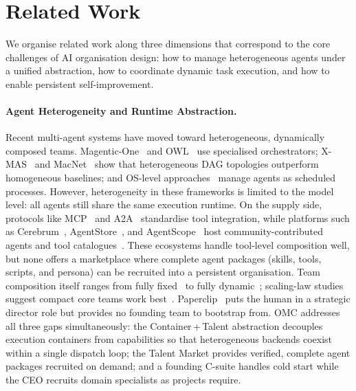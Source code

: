 \documentclass[11pt,a4paper]{article}
\begin{document}
\section{Related Work}
\label{sec:related}

We organise related work along three dimensions that correspond to the core challenges of AI organisation design: how to manage heterogeneous agents under a unified abstraction, how to coordinate dynamic task execution, and how to enable persistent self-improvement.

\paragraph{Agent Heterogeneity and Runtime Abstraction.}
Recent multi-agent systems have moved toward heterogeneous, dynamically composed teams.  Magentic-One~\cite{fourney2024magenticone} and OWL~\cite{hu2025owl} use specialised orchestrators; X-MAS~\cite{ye2025xmas} and MacNet~\cite{qian2025macnet} show that heterogeneous DAG topologies outperform homogeneous baselines; and OS-level approaches~\cite{agentforge2025, mei2025aios} manage agents as scheduled processes.  However, heterogeneity in these frameworks is limited to the model level: all agents still share the same execution runtime.  On the supply side, protocols like MCP~\cite{hou2025mcp} and A2A~\cite{google2025a2a} standardise tool integration, while platforms such as Cerebrum~\cite{rama2025cerebrum, mei2025aios}, AgentStore~\cite{jia2025agentstore}, and AgentScope~\cite{gao2025agentscope} host community-contributed agents and tool catalogues~\cite{yang2025sweagent, mcpzoo2025, singh2025registry, ehtesham2025interop}.  These ecosystems handle tool-level composition well, but none offers a marketplace where complete agent packages (skills, tools, scripts, and persona) can be recruited into a persistent organisation.  Team composition itself ranges from fully fixed~\cite{fourney2024magenticone, hu2025owl, teamofrivals2025} to fully dynamic~\cite{liu2025dylan, zhang2025aflow, shang2025agentsquare, hu2025evomac}; scaling-law studies suggest compact core teams work best~\cite{qian2025macnet, tran2025masurvey}.  Paperclip~\cite{paperclip2025} puts the human in a strategic director role but provides no founding team to bootstrap from.  OMC addresses all three gaps simultaneously: the Container\,+\,Talent abstraction decouples execution containers from capabilities so that heterogeneous backends coexist within a single dispatch loop; the Talent Market provides verified, complete agent packages recruited on demand; and a founding C-suite handles cold start while the CEO recruits domain specialists as projects require.
\end{document}
